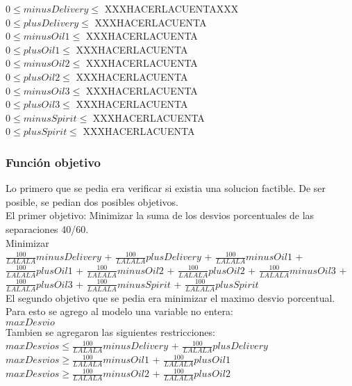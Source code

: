 $0 \leq minusDelivery \leq$ XXXHACERLACUENTAXXX \\
$0 \leq plusDelivery \leq$ XXXHACERLACUENTA \\
$0 \leq minusOil1 \leq$ XXXHACERLACUENTA \\
$0 \leq plusOil1 \leq$ XXXHACERLACUENTA \\
$0 \leq minusOil2 \leq$ XXXHACERLACUENTA \\
$0 \leq plusOil2 \leq$ XXXHACERLACUENTA \\
$0 \leq minusOil3 \leq$ XXXHACERLACUENTA \\
$0 \leq plusOil3 \leq$ XXXHACERLACUENTA \\
$0 \leq minusSpirit \leq$ XXXHACERLACUENTA \\
$0 \leq plusSpirit \leq$ XXXHACERLACUENTA \\
 \subsubsection{Funci\'on objetivo}
Lo primero que se pedia era verificar si existia una solucion factible. De ser posible, se pedian dos posibles objetivos.\\
El primer objetivo: Minimizar la suma de los desvios porcentuales de las separaciones 40/60.\\

Minimizar \\
$\frac{100}{LALALA} minusDelivery$ +
$\frac{100}{LALALA} plusDelivery$ +
$\frac{100}{LALALA} minusOil1$ +
$\frac{100}{LALALA} plusOil1$ +
$\frac{100}{LALALA} minusOil2$ +
$\frac{100}{LALALA} plusOil2$ +
$\frac{100}{LALALA} minusOil3$ +
$\frac{100}{LALALA} plusOil3$ +
$\frac{100}{LALALA} minusSpirit$ +
$\frac{100}{LALALA} plusSpirit$ \\

El segundo objetivo que se pedia era minimizar el maximo desvio porcentual.
Para esto se agrego al modelo una variable no entera: \\
$maxDesvio$ \\

Tambien se agregaron las siguientes restricciones: \\
$maxDesvios \leq \frac{100}{LALALA} minusDelivery$ +
$\frac{100}{LALALA} plusDelivery$ \\


$maxDesvios \geq \frac{100}{LALALA} minusOil1$ +
$\frac{100}{LALALA} plusOil1$ \\


$maxDesvios \geq  \frac{100}{LALALA} minusOil2$ +
$\frac{100}{LALALA} plusOil2$\\


